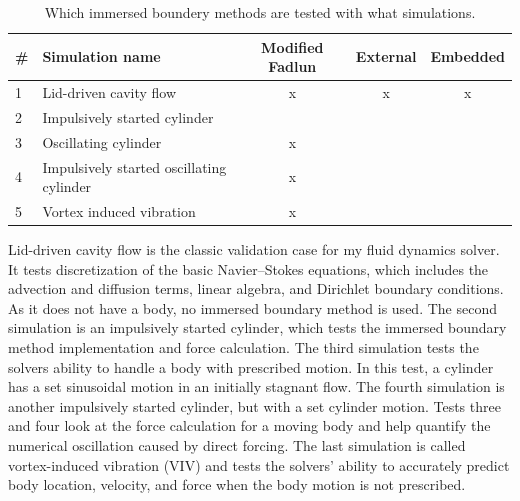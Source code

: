 \begin{table}
	\centering
	\begin{tabular}[htb]{@{}llccc@{}}
		\toprule
		\# & Simulation name & Modified Fadlun & External & Embedded \\ \midrule
		1&Lid-driven cavity flow & x & x & x \\
		2&Impulsively started cylinder & \checkmark & \checkmark & \checkmark \\
		3&Oscillating cylinder & x & \checkmark & \checkmark \\
		4&Impulsively started oscillating cylinder & x & \checkmark & \checkmark \\
		5&Vortex induced vibration & x & \checkmark & \checkmark \\
		\bottomrule
	\end{tabular}
	\caption{Which immersed boundery methods are tested with what simulations.}\label{table:1}
\end{table}

Lid-driven cavity flow is the classic validation case for my fluid dynamics solver. 
It tests discretization of the basic Navier--Stokes equations, which includes the advection and diffusion terms, linear algebra, and Dirichlet boundary conditions. 
As it does not have a body, no immersed boundary method is used. 
The second simulation is an impulsively started cylinder, which tests the immersed boundary method implementation and force calculation. 
The third simulation tests the solvers ability to handle a body with prescribed motion. 
In this test, a cylinder has a set sinusoidal motion in an initially stagnant flow. 
The fourth simulation is another impulsively started cylinder, but with a set cylinder motion. 
Tests three and four look at the force calculation for a moving body and help quantify the numerical oscillation caused by direct forcing. 
The last simulation is called vortex-induced vibration (VIV) and tests the solvers' ability to accurately predict body location, velocity, and force when the body motion is not prescribed. 


